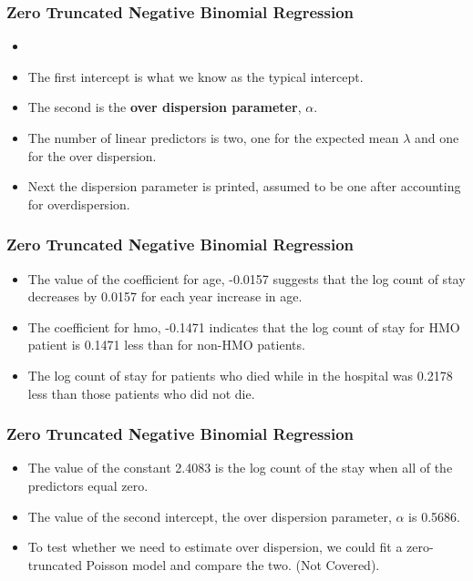 \documentclass[MASTER.tex]{subfiles}
\begin{document}
\begin{frame}
	\frametitle{Zero Truncated Negative Binomial Regression}
	\begin{itemize}
		\item 

\item The first intercept is what we know as the typical intercept. 
\item The second is the \textbf{over dispersion parameter}, $\alpha$.
\item The number of linear predictors is two, one for the expected mean $\lambda$ and one for the over dispersion.
\item Next the dispersion parameter is printed, assumed to be one after accounting for overdispersion.
\end{itemize}

\end{frame}
\begin{frame}
	\frametitle{Zero Truncated Negative Binomial Regression}
\begin{itemize}
\item The value of the coefficient for age, -0.0157 suggests that the log count of stay decreases by 0.0157 for each year increase in age.
\item The coefficient for hmo, -0.1471 indicates that the log count of stay for HMO patient is 0.1471 less than for non-HMO patients.
\item The log count of stay for patients who died while in the hospital was 0.2178 less than those patients who did not die.
\end{itemize}

\end{frame}
\begin{frame}
		\frametitle{Zero Truncated Negative Binomial Regression}
\begin{itemize}
	\item		
The value of the constant 2.4083 is the log count of the stay when all of the predictors equal zero.
\item The value of the second intercept, the over dispersion parameter, $\alpha$ is 0.5686.
\item To test whether we need to estimate over dispersion, we could fit a zero-truncated Poisson model and compare the two. (Not Covered).
\end{itemize}
\end{frame}
\end{document}
